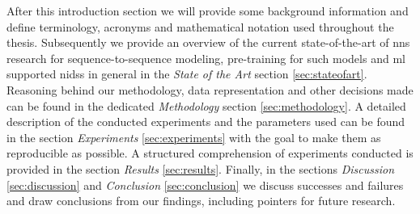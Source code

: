 After this introduction section we will provide some background information and define terminology, acronyms and mathematical notation used throughout the thesis. Subsequently we provide an overview of the current state-of-the-art of \glspl{nn} research for sequence-to-sequence modeling, pre-training for such models and \gls{ml} supported \glspl{nids} in general in the \textit{State of the Art} section \ref{sec:stateofart}. Reasoning behind our methodology, data representation and other decisions made can be found in the dedicated \textit{Methodology} section \ref{sec:methodology}. A detailed description of the conducted experiments and the parameters used can be found in the section \textit{Experiments} \ref{sec:experiments} with the goal to make them as reproducible as possible. A structured comprehension of experiments conducted is provided in the section \textit{Results} \ref{sec:results}. Finally, in the sections \textit{Discussion} \ref{sec:discussion} and \textit{Conclusion} \ref{sec:conclusion} we discuss successes and failures and draw conclusions from our findings, including pointers for future research. 


\newpage